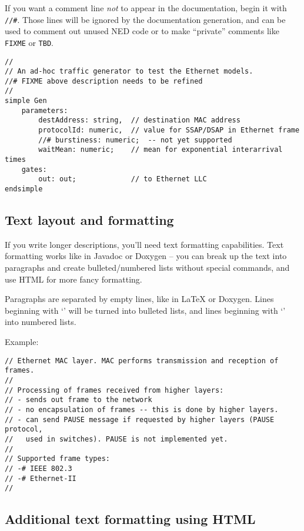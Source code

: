 If you want a comment line \textit{not} to appear in the documentation,
begin it with \texttt{//\#}. Those lines will be ignored by the
documentation generation, and can be used to comment out
unused NED code or to make ``private'' comments like \texttt{FIXME} or
\texttt{TBD}.

\begin{verbatim}
//
// An ad-hoc traffic generator to test the Ethernet models.
//# FIXME above description needs to be refined
//
simple Gen
    parameters:
        destAddress: string,  // destination MAC address
        protocolId: numeric,  // value for SSAP/DSAP in Ethernet frame
        //# burstiness: numeric;  -- not yet supported
        waitMean: numeric;    // mean for exponential interarrival times
    gates:
        out: out;             // to Ethernet LLC
endsimple
\end{verbatim}


\subsection{Text layout and formatting}

If you write longer descriptions, you'll need text formatting capabilities.
Text formatting works like in Javadoc or Doxygen -- you can break up the
text into paragraphs and create bulleted/numbered lists without
special commands, and use HTML for more fancy formatting.

Paragraphs are separated by empty lines, like in LaTeX or Doxygen.
Lines beginning with `\ttt{-}' will be turned into bulleted lists,
and lines beginning with `\ttt{-\#}' into numbered lists.

Example:

\begin{verbatim}
// Ethernet MAC layer. MAC performs transmission and reception of frames.
//
// Processing of frames received from higher layers:
// - sends out frame to the network
// - no encapsulation of frames -- this is done by higher layers.
// - can send PAUSE message if requested by higher layers (PAUSE protocol,
//   used in switches). PAUSE is not implemented yet.
//
// Supported frame types:
// -# IEEE 802.3
// -# Ethernet-II
//
\end{verbatim}

\subsection{Additional text formatting using HTML}

